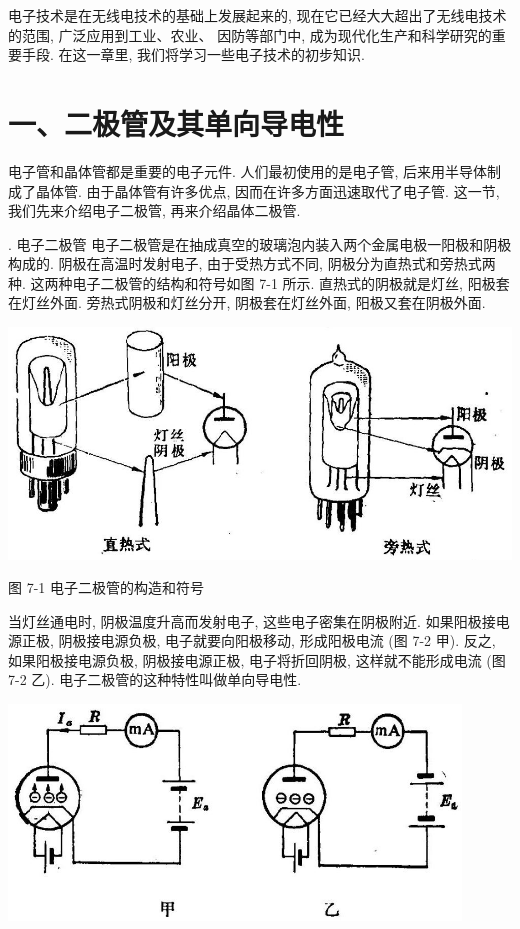 \documentclass[10pt]{article}
\begin{document}
电子技术是在无线电技术的基础上发展起来的, 现在它已经大大超出了无线电技术的范围, 广泛应用到工业、农业、 因防等部门中, 成为现代化生产和科学研究的重要手段. 在这一章里, 我们将学习一些电子技术的初步知识.

\section*{一、二极管及其单向导电性}

电子管和晶体管都是重要的电子元件. 人们最初使用的是电子管, 后来用半导体制成了晶体管. 由于晶体管有许多优点, 因而在许多方面迅速取代了电子管. 这一节, 我们先来介绍电子二极管, 再来介绍晶体二极管.

. 电子二极管 电子二极管是在抽成真空的玻璃泡内装入两个金属电极一阳极和阴极构成的. 阴极在高温时发射电子, 由于受热方式不同, 阴极分为直热式和旁热式两种. 这两种电子二极管的结构和符号如图 7-1 所示. 直热式的阴极就是灯丝, 阳极套在灯丝外面. 旁热式阴极和灯丝分开, 阴极套在灯丝外面, 阳极又套在阴极外面.

\begin{center}
\includegraphics[max width=1.0\textwidth]{images/01913056-1f15-74d8-9184-9aab52c9d66b_221_301529.jpg}
\end{center}

图 7-1 电子二极管的构造和符号

当灯丝通电时, 阴极温度升高而发射电子, 这些电子密集在阴极附近. 如果阳极接电源正极, 阴极接电源负极, 电子就要向阳极移动, 形成阳极电流 (图 7-2 甲). 反之, 如果阳极接电源负极, 阴极接电源正极, 电子将折回阴极, 这样就不能形成电流 (图 7-2 乙). 电子二极管的这种特性叫做单向导电性.

\begin{center}
\includegraphics[max width=0.9\textwidth]{images/01913056-1f15-74d8-9184-9aab52c9d66b_222_805643.jpg}
\end{center}
\end{document}
